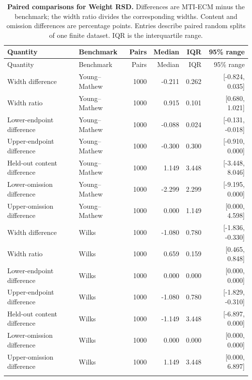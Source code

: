 \begingroup
\footnotesize
\setlength{\tabcolsep}{3pt}
\begin{longtable}{@{}llrrrr@{}}
\caption{\textbf{Paired comparisons for Weight RSD.} Differences are MTI-ECM minus the benchmark; the width ratio divides the corresponding widths. Content and omission differences are percentage points. Entries describe paired random splits of one finite dataset. IQR is the interquartile range.}\label{tab:supp-pharma-rsd-paired}\\
\toprule
Quantity & Benchmark & Pairs & Median & IQR & 95\% range\\
\midrule
\endfirsthead
\toprule
Quantity & Benchmark & Pairs & Median & IQR & 95\% range\\
\midrule
\endhead
Width difference & Young--Mathew & 1000 & -0.211 & 0.262 & [-0.824, 0.035] \\
Width ratio & Young--Mathew & 1000 & 0.915 & 0.101 & [0.680, 1.021] \\
Lower-endpoint difference & Young--Mathew & 1000 & -0.088 & 0.024 & [-0.131, -0.018] \\
Upper-endpoint difference & Young--Mathew & 1000 & -0.300 & 0.300 & [-0.910, 0.000] \\
Held-out content difference & Young--Mathew & 1000 & 1.149 & 3.448 & [-3.448, 8.046] \\
Lower-omission difference & Young--Mathew & 1000 & -2.299 & 2.299 & [-9.195, 0.000] \\
Upper-omission difference & Young--Mathew & 1000 & 0.000 & 1.149 & [0.000, 4.598] \\
\addlinespace
Width difference & Wilks & 1000 & -1.080 & 0.780 & [-1.836, -0.330] \\
Width ratio & Wilks & 1000 & 0.659 & 0.159 & [0.465, 0.848] \\
Lower-endpoint difference & Wilks & 1000 & 0.000 & 0.000 & [0.000, 0.000] \\
Upper-endpoint difference & Wilks & 1000 & -1.080 & 0.780 & [-1.829, -0.310] \\
Held-out content difference & Wilks & 1000 & -1.149 & 3.448 & [-6.897, 0.000] \\
Lower-omission difference & Wilks & 1000 & 0.000 & 0.000 & [0.000, 0.000] \\
Upper-omission difference & Wilks & 1000 & 1.149 & 3.448 & [0.000, 6.897] \\
\addlinespace
\bottomrule
\end{longtable}
\endgroup
